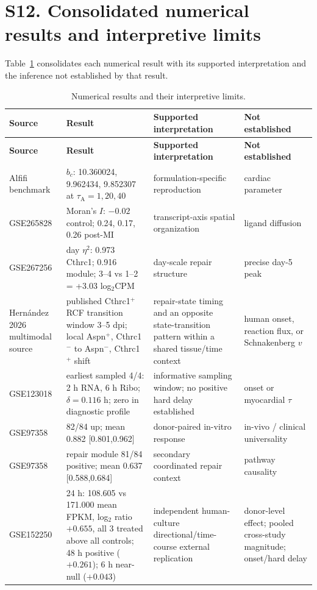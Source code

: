 \documentclass[11pt]{article}
\begin{document}
\section*{S12. Consolidated numerical results and interpretive limits}
Table~\ref{tab:ledger} consolidates each numerical result with its supported interpretation and the inference not established by that result.
\begin{longtable}{p{2.2cm}p{4.2cm}p{4.0cm}p{3.2cm}}
\caption{Numerical results and their interpretive limits.}\label{tab:ledger}\\
\toprule \textbf{Source} & \textbf{Result} & \textbf{Supported interpretation} & \textbf{Not established}\\\midrule\endfirsthead
\toprule \textbf{Source} & \textbf{Result} & \textbf{Supported interpretation} & \textbf{Not established}\\\midrule\endhead
Alfifi benchmark & $b_c$: 10.360024, 9.962434, 9.852307 at $\tau_{\mathrm A}=1,20,40$ & formulation-specific reproduction & cardiac parameter\\
GSE265828 & Moran's $I$: $-0.02$ control; 0.24, 0.17, 0.26 post-MI & transcript-axis spatial organization & ligand diffusion\\
GSE267256 & day $\eta^2$: 0.973 Cthrc1; 0.916 module; 3--4 vs 1--2 = +3.03 log$_2$CPM & day-scale repair structure & precise day-5 peak\\
Hern\'andez 2026 multimodal source & published Cthrc1$^+$ RCF transition window 3--5 dpi; local Aspn$^+$, Cthrc1$^-$ to Aspn$^-$, Cthrc1$^+$ shift & repair-state timing and an opposite state-transition pattern within a shared tissue/time context & human onset, reaction flux, or Schnakenberg $v$\\
GSE123018 & earliest sampled 4/4: 2 h RNA, 6 h Ribo; $\delta=0.116$ h; zero in diagnostic profile & informative sampling window; no positive hard delay established & onset or myocardial $\tau$\\
GSE97358 & \cthrc{} 82/84 up; mean 0.882 [0.801,0.962] & donor-paired in-vitro \tgfb{} response & in-vivo / clinical universality\\
GSE97358 & repair module 81/84 positive; mean 0.637 [0.588,0.684] & secondary coordinated repair context & pathway causality\\
GSE152250 & \cthrc{} 24 h: 108.605 vs 171.000 mean FPKM, log$_2$ ratio $+0.655$, all 3 treated above all controls; 48 h positive ($+0.261$); 6 h near-null ($+0.043$) & independent human-culture directional/time-course external replication & donor-level effect; pooled cross-study magnitude; onset/hard delay\\

\end{longtable}
\end{document}
